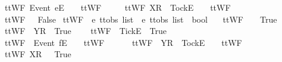 \begin{isabellebody}
{\ \ {\isachardoublequoteopen}ttWF\ {\isacharparenleft}{\isacharbrackleft}Event\ e{\isacharbrackright}\isactrlsub E\ {\isacharhash}\ {\isasymsigma}{\isacharparenright}\ {\isacharequal}\ ttWF\ {\isasymsigma}{\isachardoublequoteclose}\ {\isacharbar}\ \isanewline
\ \ {\isachardoublequoteopen}ttWF\ {\isacharparenleft}{\isacharbrackleft}X{\isacharbrackright}\isactrlsub R\ {\isacharhash}\ {\isacharbrackleft}Tock{\isacharbrackright}\isactrlsub E\ {\isacharhash}\ {\isasymsigma}{\isacharparenright}\ {\isacharequal}\ ttWF\ {\isasymsigma}{\isachardoublequoteclose}\ {\isacharbar}\ \isanewline
\ \ {\isachardoublequoteopen}ttWF\ {\isasymsigma}\ {\isacharequal}\ False{\isachardoublequoteclose}%
}%
\isamarkupfalse%
\ ttWF{}\ {\isacharcolon}{\isacharcolon}\ {\isachardoublequoteopen}{\isacharprime}e\ ttobs\ list\ {\isasymRightarrow}\ {\isacharprime}e\ ttobs\ list\ {\isasymRightarrow}\ bool{\isachardoublequoteclose}\ \isanewline
\ \ {\isachardoublequoteopen}ttWF{}\ {\isacharbrackleft}{\isacharbrackright}\ {\isacharbrackleft}{\isacharbrackright}\ {\isacharequal}\ True{\isachardoublequoteclose}\ {\isacharbar}\ \isanewline
\ \ {\isachardoublequoteopen}ttWF{}\ {\isacharbrackleft}{\isacharbrackright}\ {\isacharbrackleft}{\isacharbrackleft}Y{\isacharbrackright}\isactrlsub R{\isacharbrackright}\ {\isacharequal}\ True{\isachardoublequoteclose}\ {\isacharbar}\ \isanewline
\ \ {\isachardoublequoteopen}ttWF{}\ {\isacharbrackleft}{\isacharbrackright}\ {\isacharbrackleft}{\isacharbrackleft}Tick{\isacharbrackright}\isactrlsub E{\isacharbrackright}\ {\isacharequal}\ True{\isachardoublequoteclose}\ {\isacharbar}\ \isanewline
\ \ {\isachardoublequoteopen}ttWF{}\ {\isacharbrackleft}{\isacharbrackright}\ {\isacharparenleft}{\isacharbrackleft}Event\ f{\isacharbrackright}\isactrlsub E\ {\isacharhash}\ {\isasymsigma}{\isacharparenright}\ {\isacharequal}\ ttWF{}\ {\isacharbrackleft}{\isacharbrackright}\ {\isasymsigma}{\isachardoublequoteclose}\ {\isacharbar}\ \isanewline
\ \ {\isachardoublequoteopen}ttWF{}\ {\isacharbrackleft}{\isacharbrackright}\ {\isacharparenleft}{\isacharbrackleft}Y{\isacharbrackright}\isactrlsub R\ {\isacharhash}\ {\isacharbrackleft}Tock{\isacharbrackright}\isactrlsub E\ {\isacharhash}\ {\isasymsigma}{\isacharparenright}\ {\isacharequal}\ ttWF{}\ {\isacharbrackleft}{\isacharbrackright}\ {\isasymsigma}{\isachardoublequoteclose}\ {\isacharbar}\ \isanewline
\ \ {\isachardoublequoteopen}ttWF{}\ {\isacharbrackleft}{\isacharbrackleft}X{\isacharbrackright}\isactrlsub R{\isacharbrackright}\ {\isacharbrackleft}{\isacharbrackright}\ {\isacharequal}\ True{\isachardoublequoteclose}\ {\isacharbar}\ \isanewline

\end{isabellebody}
